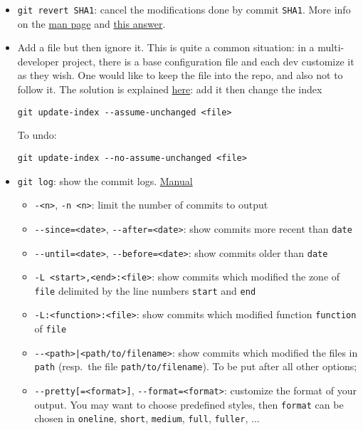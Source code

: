 \documentclass[a4paper,12pt,%
              final%
              ]{article}
\begin{document}
\begin{itemize}
\begin{itemize}
    \end{itemize}
  \item \texttt{git revert SHA1}: cancel the modifications done by commit \texttt{SHA1}. More info on the \href{https://git-scm.com/docs/git-revert}{man page} and \href{https://stackoverflow.com/a/4114122}{this answer}.
  \item Add a file but then ignore it. This is quite a common situation: in a multi-developer project, there is a base configuration file and each dev customize it as they wish. One would like to keep the file into the repo, and also not to follow it. The solution is explained \href{https://stackoverflow.com/questions/3319479/can-i-git-commit-a-file-and-ignore-its-content-changes}{here}: add it then change the index
\begin{verbatim}
git update-index --assume-unchanged <file>
\end{verbatim}
    To undo:
\begin{verbatim}
git update-index --no-assume-unchanged <file>
\end{verbatim}
  \item \texttt{git log}: show the commit logs. \href{https://git-scm.com/docs/git-log}{Manual}
    \begin{itemize}
      \item \texttt{-<n>}, \texttt{-n <n>}: limit the number of commits to output
      \item \verb|--since=<date>|, \verb|--after=<date>|: show commits more recent than \texttt{date}
      \item \verb|--until=<date>|, \verb|--before=<date>|: show commits older than \texttt{date}
      \item \verb|-L <start>,<end>:<file>|: show commits which modified the zone of \texttt{file} delimited by the line numbers \texttt{start} and \texttt{end}
      \item \verb|-L:<function>:<file>|: show commits which modified function \texttt{function} of \texttt{file}
      \item \verb!--<path>|<path/to/filename>!: show commits which modified the files in \texttt{path} (resp.\ the file \verb|path/to/filename|). To be put after all other options;
      \item \verb|--pretty[=<format>]|, \verb|--format=<format>|: customize the format of your output. You may want to choose predefined styles, then \texttt{format} can be chosen in \texttt{oneline}, \texttt{short}, \texttt{medium}, \texttt{full}, \texttt{fuller}, ...
    \end{itemize}

\end{itemize}
\end{document}
